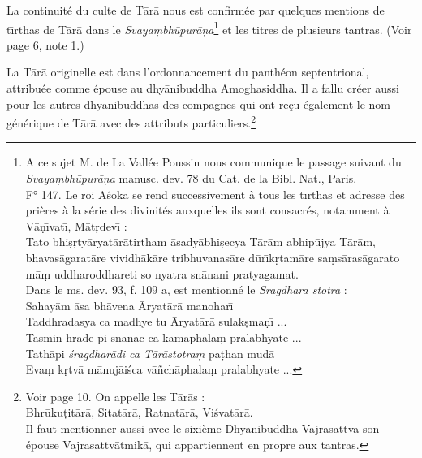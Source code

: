 \documentclass[a4paper, 11pt, oneside, french]{article}
\begin{document}
La continuité du culte de T\={a}r\={a} nous est confirmée par quelques mentions de t\={\i}rthas de T\={a}r\={a} dans le \emph{Svaya\d{m}bh\={u}pur\={a}\d{n}a}\footnote{A ce sujet M. de La Vallée Poussin nous communique le passage suivant du \emph{Svaya\d{m}bh\={u}pur\={a}\d{n}a} manusc. dev. 78 du Cat. de la Bibl. Nat., Paris.\\\hspace*{5mm}F° 147. Le roi A\'{s}oka se rend successivement à tous les t\={\i}rthas et adresse des prières à la série des divinités auxquelles ils sont consacrés, notamment à V\={a}\d{n}\={\i}vat\={\i}, M\={a}t\d{r}dev\={\i} :\\\hspace*{5mm}Tato bhi\d{s}\d{r}ty\={a}ryat\={a}r\={a}tirtham \={a}sady\={a}bhi\d{s}ecya T\={a}r\={a}m abhip\={u}jya T\={a}r\={a}m, bhavas\={a}garat\={a}re vividh\={a}k\={a}re tribhuvanas\={a}re d\={u}r\={\i}k\d{r}tam\={a}re sa\d{m}s\={a}ras\={a}garato m\={a}\d{m} uddharoddhareti so nyatra sn\={a}nani pratyagamat.\\\hspace*{5mm}Dans le ms. dev. 93, f. 109 a, est mentionné le \emph{Sragdhar\={a} stotra} :\\\hspace*{10mm}Sahay\={a}m \={a}sa bh\={a}vena \={A}ryat\={a}r\={a} manohar\={\i}\\\hspace*{10mm}Taddhradasya ca madhye tu \={A}ryat\={a}r\={a} sulak\d{s}ma\d{n}\={\i} ...\\\hspace*{10mm}Tasmin hrade pi sn\={a}n\={a}c ca k\={a}maphala\d{m} pralabhyate ...\\\hspace*{10mm}Tath\={a}pi \emph{\'{s}ragdhar\={a}di ca T\={a}r\={a}stotra\d{m}} pa\d{t}han mud\={a}\\\hspace*{10mm}Eva\d{m} k\d{r}tv\={a} m\={a}nuj\={a}i\'{s}ca v\={a}\~{n}ch\={a}phala\d{m} pralabhyate ...} et les titres de plusieurs tantras. (Voir page 6, note 1.)

La T\={a}r\={a} originelle est dans l'ordonnancement du panthéon septentrional, attribuée comme épouse au dhy\={a}nibuddha Amoghasiddha. Il a fallu créer aussi pour les autres dhy\={a}nibuddhas des compagnes qui ont reçu également le nom générique de T\={a}r\={a} avec des attributs particuliers.\footnote{Voir page 10. On appelle les T\={a}r\={a}s :\\\hspace*{10mm}Bhr\={u}ku\d{t}it\={a}r\={a}, Sitat\={a}r\={a}, Ratnat\={a}r\={a}, Vi\'{s}vat\={a}r\={a}.\\\hspace*{5mm}Il faut mentionner aussi avec le sixième Dhy\={a}nibuddha Vajrasattva son épouse Vajrasattv\={a}tmik\={a}, qui appartiennent en propre aux tantras.}
\end{document}
